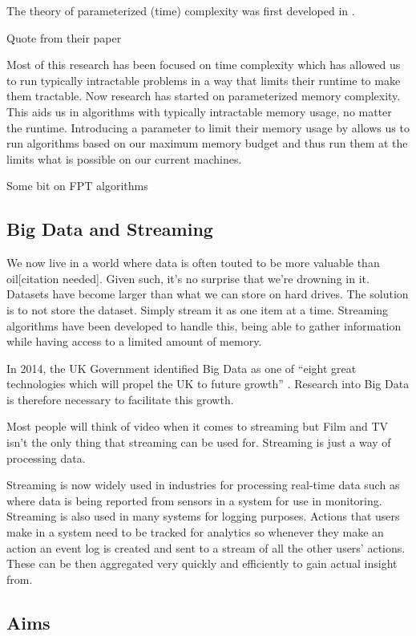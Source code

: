 The theory of parameterized (time) complexity was first developed in
\cite{downey1999parameterized}.

Quote from their paper

Most of this research has been focused on time complexity which has allowed us
to run typically intractable problems in a way that limits their runtime to
make them tractable. Now research has started on parameterized memory
complexity. This aids us in algorithms with typically intractable memory usage,
no matter the runtime. Introducing a parameter to limit their memory usage by
allows us to run algorithms based on our maximum memory budget and thus run
them at the limits what is possible on our current machines.

Some bit on FPT algorithms

\subsection{Big Data and Streaming}

We now live in a world where data is often touted to be more valuable than
oil[citation needed]. Given such, it's no surprise that we're drowning in it.
Datasets have become larger than what we can store on hard drives. The solution
is to not store the dataset. Simply stream it as one item at a time. Streaming
algorithms have been developed to handle this, being able to gather information
while having access to a limited amount of memory.

In 2014, the UK Government identified Big Data as one of ``eight great
technologies which will propel the UK to future growth''
\cite{intellectualpropertyoffice2014}. Research into Big Data is therefore
necessary to facilitate this growth.

Most people will think of video when it comes to streaming but Film and TV
isn't the only thing that streaming can be used for. Streaming is just a way of
processing data.

Streaming is now widely used in industries for processing real-time data such
as where data is being reported from sensors in a system for use in monitoring.
Streaming is also used in many systems for logging purposes. Actions that users
make in a system need to be tracked for analytics so whenever they make an
action an event log is created and sent to a stream of all the other users'
actions. These can be then aggregated very quickly and efficiently to gain
actual insight from.

\subsection{Aims}


